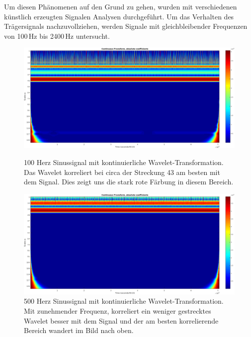 \begin{refsection}
Um diesen Phänomenen auf den Grund zu gehen, wurden mit verschiedenen künstlich erzeugten Signalen Analysen durchgeführt.
Um das Verhalten des Trägersignals nachzuvollziehen, werden Signale mit gleichbleibender Frequenzen von 100\,Hz bis 2400\,Hz untersucht.
\begin{figure}
	\centering
	\includegraphics[width=1.0\linewidth]{papers/meteor/images/anomalie/beam/cwt_0100hz-clipped.png}
	\caption{100 Herz Sinussignal mit kontinuierliche Wavelet-Transformation.
	Das Wavelet korreliert bei circa der Streckung 43 am besten mit dem Signal. 
	Dies zeigt uns die stark rote Färbung in diesem Bereich.}
	\includegraphics[width=1.0\linewidth]{papers/meteor/images/anomalie/beam/cwt_0500hz-clipped.png}
	\caption{500 Herz Sinussignal mit kontinuierliche Wavelet-Transformation.
	Mit zunehmender Frequenz, korreliert ein weniger gestrecktes Wavelet besser mit dem Signal und der am besten korrelierende Bereich wandert im Bild nach oben. }
	\label{fig:cwt_anomalie_beam_1}
\end{figure}


\end{refsection}
